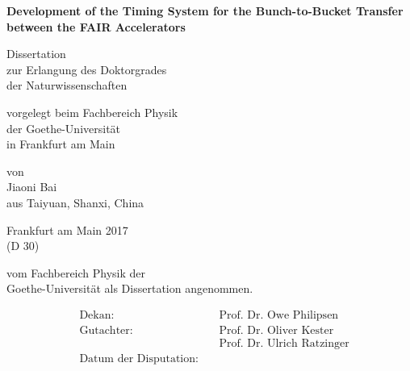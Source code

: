 \documentclass[12pt,twoside]{report}
\renewcommand{\_}{%
  \textunderscore\hspace{0pt}%
}
\begin{document}
\begin{center}
\thispagestyle{empty}

	 \vspace* {2cm}
	 \LARGE \textbf{Development of the Timing System for the Bunch-to-Bucket Transfer between the FAIR Accelerators }\par
	 \vspace{2cm}
    	 \vspace{2cm}

{ \normalsize  Dissertation\\
	zur Erlangung des Doktorgrades\\
	der Naturwissenschaften
\par}
    \vspace{2cm}

{ \normalsize vorgelegt beim Fachbereich Physik\\
der Goethe-Universit\"at\\
in Frankfurt am Main\par}
    \vspace{2cm}

{ \normalsize von\\
	Jiaoni Bai\\
	aus Taiyuan, Shanxi, China\par}
    \vspace{2cm}

    \vspace{2cm}
{ \normalsize Frankfurt am Main 2017\\
	(D 30)\par}
\end{center}

\clearpage
\thispagestyle{empty}
\begin{flushleft}
	 \vspace* {6cm}
{ \normalsize vom Fachbereich Physik der \\
    \vspace{0.5cm}
	Goethe-Universit\"at als Dissertation angenommen.}\par
    \vspace{4cm}
	


		
	\normalsize
	\begin{align*}
		 &\text{Dekan: }\:  &&\text{Prof. Dr. Owe Philipsen}\\[0.5cm]
		 &\text{Gutachter:}\: &&\text{Prof. Dr. Oliver Kester}\\[0.5cm]
		 &						&&\text{Prof. Dr. Ulrich Ratzinger}\\[0.5cm]
		 &\text{Datum der Disputation:}\: &&\text{} \\[0.5cm]
\end{align*}
\end{flushleft}    
\end{document}
